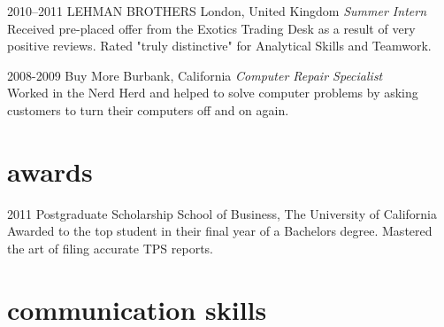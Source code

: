 \documentclass[a4paper]{cv-friggeri-x}
\begin{document}
\begin{entrylist}

\entry
{2010--2011}
{LEHMAN BROTHERS}
{London, United Kingdom}
{\emph{Summer Intern} \\
Received pre-placed offer from the Exotics Trading Desk as a result of very positive reviews. Rated "truly distinctive" for Analytical Skills and Teamwork.}


\entry
{2008-2009}
{Buy More}
{Burbank, California}
{\emph{Computer Repair Specialist} \\
Worked in the Nerd Herd and helped to solve computer problems by asking customers to turn their computers off and on again.}


\end{entrylist}


\section{awards}

\begin{entrylist}


\entry
{2011}
{Postgraduate Scholarship}
{School of Business, The University of California}
{Awarded to the top student in their final year of a Bachelors degree. Mastered the art of filing accurate TPS reports.}


\end{entrylist}


\section{communication skills}
\end{document}
